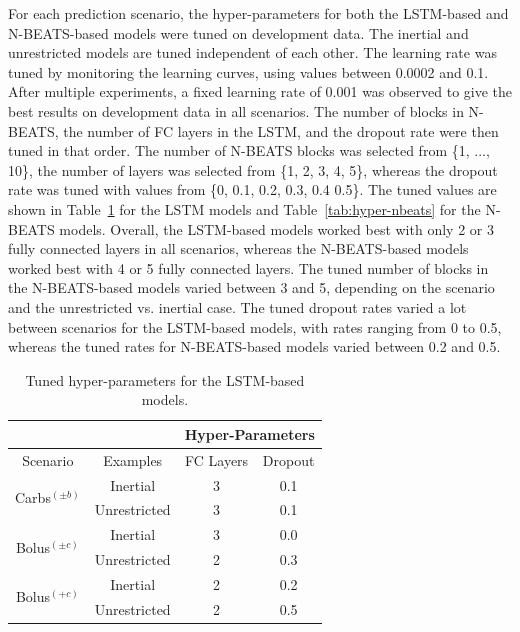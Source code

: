 \documentclass[journal,article,submit,moreauthors,pdftex]{Definitions/mdpi}
\begin{document}
For each prediction scenario, the hyper-parameters for both the LSTM-based and N-BEATS-based models were tuned on development data. The inertial and unrestricted models are tuned independent of each other. The learning rate was tuned by monitoring the learning curves, using values between 0.0002 \cite{rubin_falcone:nbeats_bgl} and 0.1. After multiple experiments, a fixed learning rate of 0.001 was observed to give the best results on development data in all scenarios. The number of blocks in N-BEATS, the number of FC layers in the LSTM, and the dropout rate were then tuned in that order. The number of N-BEATS blocks was selected from \{1, ..., 10\}, the number of layers was selected from \{1, 2, 3, 4, 5\}, whereas the dropout rate was tuned with values from \{0, 0.1, 0.2, 0.3, 0.4 0.5\}. The tuned values are shown in Table~\ref{tab:hyper-lstm} for the LSTM models and Table~\ref{tab:hyper-nbeats} for the N-BEATS models. Overall, the LSTM-based models worked best with only 2 or 3 fully connected layers in all scenarios, whereas the N-BEATS-based models worked best with 4 or 5 fully connected layers. The tuned number of blocks in the N-BEATS-based models varied between 3 and 5, depending on the scenario and the unrestricted vs. inertial case. The tuned dropout rates varied a lot between scenarios for the LSTM-based models, with rates ranging from 0 to 0.5, whereas the tuned rates for N-BEATS-based models varied between 0.2 and 0.5.

\begin{table}[ht]
\caption{Tuned hyper-parameters for the LSTM-based models.}
\label{tab:hyper-lstm}
\begin{center}
\begin{tabular}{|c|c|c|c|}
\cline{3-4}
\multicolumn{2}{l}{} & \multicolumn{2}{|c|}{Hyper-Parameters}\\
\hline
Scenario & Examples & FC Layers & Dropout\\
\hline
\multirow{2}{*}{Carbs$^{(\pm b)}$} & Inertial & 3 & 0.1\\
& Unrestricted & 3 & 0.1\\
\hline
\multirow{2}{*}{Bolus$^{(\pm c)}$} & Inertial & 3 & 0.0\\
& Unrestricted & 2 & 0.3\\
\hline
\multirow{2}{*}{Bolus$^{(+c)}$} & Inertial & 2 & 0.2\\
& Unrestricted & 2 & 0.5\\
\hline
\end{tabular}
\end{center}
\end{table}
\end{document}
